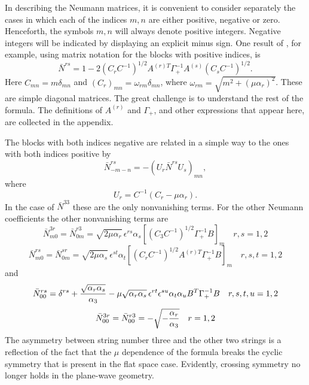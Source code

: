 \documentclass[a4paper,12pt]{article}
\begin{document}
In describing the Neumann matrices, it is convenient to consider
separately the cases in which each of the indices $m,n$ are either
positive, negative or zero. Henceforth, the symbols $m,n$ will
always denote positive integers. Negative integers will be
indicated by displaying an explicit minus sign.  One result of
\cite{Spradlin:2002ar}, for example, using matrix notation for the
blocks with positive indices, is
\begin{equation}
\bar N^{rs} = 1 - 2 (C_r C^{-1})^{1/2} A^{(r)T}
\Gamma_+^{-1}A^{(s)} (C_s C^{-1})^{1/2}.
\end{equation}
Here $C_{mn} = m \delta_{mn}$ and $(C_r)_{mn} = \omega_{rm}
\delta_{mn}$, where $ \omega_{rm} = \sqrt{ m^2 +
(\mu\alpha_r)^2}$. These are simple diagonal matrices. The great
challenge is to understand the rest of the formula. The
definitions of $A^{(r)}$ and $\Gamma_+$, and other expressions
that appear here, are collected in the appendix.

The blocks with both indices negative are related in a simple way
to the ones with both indices positive by
\begin{equation}
\bar N_{-m-n}^{rs} = - \left( U_r \bar N^{rs} U_s \right)_{mn},
\end{equation}
where
\begin{equation}
U_r = C^{-1} (C_r - \mu \alpha_r).
\end{equation}
In the case of $\bar N^{33}$ these are the only nonvanishing
terms. For the other Neumann coefficients the other nonvanishing
terms are
\begin{equation}
\bar N_{m0}^{3r} = \bar N_{0m}^{r3} = \sqrt{2\mu\alpha_r}\,
\epsilon^{rs}\alpha_s \left[ \left(C_3 C^{-1}\right)^{1/2}
\Gamma_+^{-1} B \right]_m \quad r,s = 1,2
\end{equation}
\begin{equation}
\bar N_{m0}^{rs} = \bar N_{0m}^{sr} = \sqrt{2\mu\alpha_s}\,
\epsilon^{st}\alpha_t \left[ \left(C_r C^{-1}\right)^{1/2}
A^{(r)T} \Gamma_+^{-1} B \right]_m \quad r,s,t = 1,2
\end{equation}
and
\begin{equation}
\bar N_{00}^{rs} = \delta^{rs} + {\sqrt{\alpha_r\alpha_s} \over
\alpha_3} -\mu\sqrt{\alpha_r\alpha_s}\,
\epsilon^{rt}\epsilon^{su}\alpha_t \alpha_u B^T \Gamma_+^{-1} B
 \quad r,s,t,u = 1,2
\end{equation}
\begin{equation}
\bar N_{00}^{3r} = \bar N_{00}^{r3} = - \sqrt{-{\alpha_r \over
\alpha_3}} \quad r = 1,2
\end{equation}
The asymmetry between string number three and the other two
strings is a reflection of the fact that the $\mu$ dependence of
the formula breaks the cyclic symmetry that is present in the flat
space case. Evidently, crossing symmetry no longer holds in the
plane-wave geometry.
\end{document}
